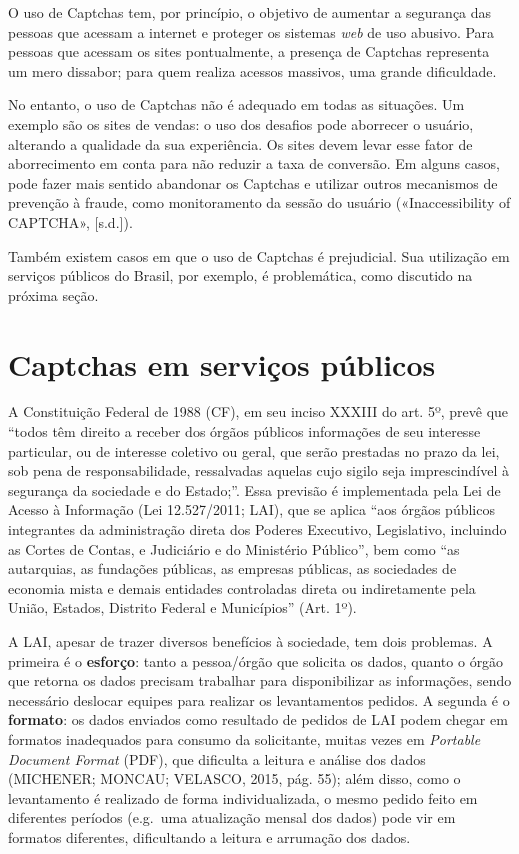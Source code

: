 \documentclass[12pt,twoside,brazilian]{book}
\begin{document}
O uso de Captchas tem, por princípio, o objetivo de aumentar a segurança
das pessoas que acessam a internet e proteger os sistemas \emph{web} de
uso abusivo. Para pessoas que acessam os sites pontualmente, a presença
de Captchas representa um mero dissabor; para quem realiza acessos
massivos, uma grande dificuldade.

No entanto, o uso de Captchas não é adequado em todas as situações. Um
exemplo são os sites de vendas: o uso dos desafios pode aborrecer o
usuário, alterando a qualidade da sua experiência. Os sites devem levar
esse fator de aborrecimento em conta para não reduzir a taxa de
conversão. Em alguns casos, pode fazer mais sentido abandonar os
Captchas e utilizar outros mecanismos de prevenção à fraude, como
monitoramento da sessão do usuário ({«Inaccessibility of CAPTCHA»},
{[}s.d.{]}).

Também existem casos em que o uso de Captchas é prejudicial. Sua
utilização em serviços públicos do Brasil, por exemplo, é problemática,
como discutido na próxima seção.

\hypertarget{captchas-em-serviuxe7os-puxfablicos}{%
\section{Captchas em serviços
públicos}\label{captchas-em-serviuxe7os-puxfablicos}}

A Constituição Federal de 1988 (CF), em seu inciso XXXIII do art. 5º,
prevê que ``todos têm direito a receber dos órgãos públicos informações
de seu interesse particular, ou de interesse coletivo ou geral, que
serão prestadas no prazo da lei, sob pena de responsabilidade,
ressalvadas aquelas cujo sigilo seja imprescindível à segurança da
sociedade e do Estado;''. Essa previsão é implementada pela Lei de
Acesso à Informação (Lei 12.527/2011; LAI), que se aplica ``aos órgãos
públicos integrantes da administração direta dos Poderes Executivo,
Legislativo, incluindo as Cortes de Contas, e Judiciário e do Ministério
Público'', bem como ``as autarquias, as fundações públicas, as empresas
públicas, as sociedades de economia mista e demais entidades controladas
direta ou indiretamente pela União, Estados, Distrito Federal e
Municípios'' (Art. 1º).

A LAI, apesar de trazer diversos benefícios à sociedade, tem dois
problemas. A primeira é o \textbf{esforço}: tanto a pessoa/órgão que
solicita os dados, quanto o órgão que retorna os dados precisam
trabalhar para disponibilizar as informações, sendo necessário deslocar
equipes para realizar os levantamentos pedidos. A segunda é o
\textbf{formato}: os dados enviados como resultado de pedidos de LAI
podem chegar em formatos inadequados para consumo da solicitante, muitas
vezes em \emph{Portable Document Format} (PDF), que dificulta a leitura
e análise dos dados (MICHENER; MONCAU; VELASCO, 2015, pág. 55); além
disso, como o levantamento é realizado de forma individualizada, o mesmo
pedido feito em diferentes períodos (e.g.~uma atualização mensal dos
dados) pode vir em formatos diferentes, dificultando a leitura e
arrumação dos dados.
\end{document}
